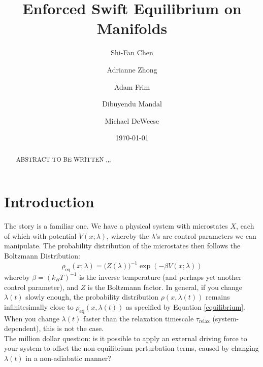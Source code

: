\documentclass[%
 reprint,
 amsmath,amssymb,
 aps,
]{revtex4-2}
\begin{document}

\title{Enforced Swift Equilibrium on Manifolds}%

\author{Shi-Fan Chen}
\author{Adrianne Zhong}%
\author{Adam Frim}%
\author{Dibuyendu Mandal}
\author{Michael DeWeese}
%

\date{\today}%

\begin{abstract}
ABSTRACT TO BE WRITTEN ,,,

\end{abstract}

\maketitle


\section{Introduction}

The story is a familiar one. We have a physical system with microstates $X$, each of which with potential $V(x; \lambda)$, whereby the $\lambda$'s are control parameters we can manipulate. The probability distribution of the microstates then follows the Boltzmann Distribution: %
\begin{equation} \label{equilibrium}
    \rho_\mathrm{eq}(x; \lambda) = \big(Z(\lambda)\big)^{-1} \exp(-\beta V(x; \lambda))
\end{equation}
\noindent
whereby $\beta = (k_B T)^{-1}$ is the inverse temperature (and perhaps yet another control parameter), and $Z$ is the Boltzmann factor. In general, if you change $\lambda(t)$ slowly enough, the probability distribution $\rho(x, \lambda(t))$ remains infinitesimally close to $\rho_\mathrm{eq}(x, \lambda(t))$ as specified by Equation \ref{equilibrium}. When you change $\lambda(t)$ faster than the relaxation timescale $\tau_\mathrm{relax}$ (system-dependent), this is not the case.
\\
The million dollar question: is it possible to apply an external driving force to your system to offset the non-equilibrium perturbation terms, caused by changing $\lambda(t)$ in a non-adiabatic manner?
\end{document}

